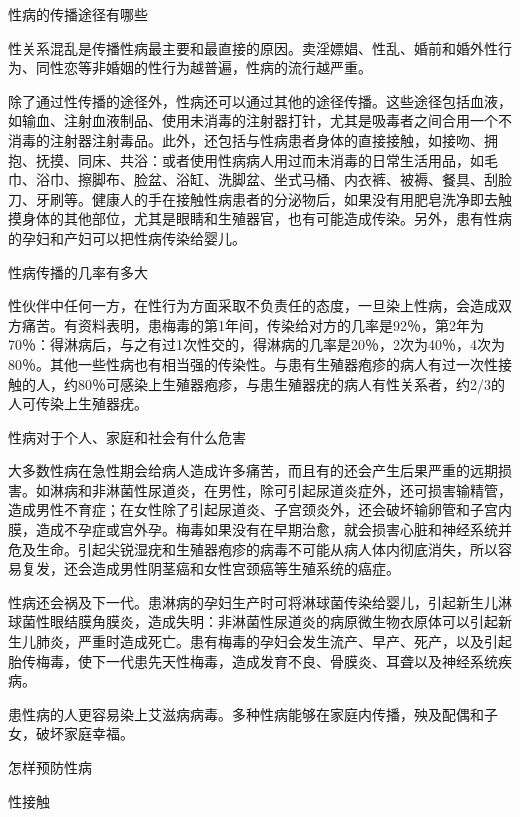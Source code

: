 \documentclass[12pt,UTF8]{ctexbook}
\begin{document}
性病的传播途径有哪些


性关系混乱是传播性病最主要和最直接的原因。卖淫嫖娼、性乱、婚前和婚外性行为、同性恋等非婚姻的性行为越普遍，性病的流行越严重。

除了通过性传播的途径外，性病还可以通过其他的途径传播。这些途径包括血液，如输血、注射血液制品、使用未消毒的注射器打针，尤其是吸毒者之间合用一个不消毒的注射器注射毒品。此外，还包括与性病患者身体的直接接触，如接吻、拥抱、抚摸、同床、共浴：或者使用性病病人用过而未消毒的日常生活用品，如毛巾、浴巾、擦脚布、脸盆、浴缸、洗脚盆、坐式马桶、内衣裤、被褥、餐具、刮脸刀、牙刷等。健康人的手在接触性病患者的分泌物后，如果没有用肥皂洗净即去触摸身体的其他部位，尤其是眼睛和生殖器官，也有可能造成传染。另外，患有性病的孕妇和产妇可以把性病传染给婴儿。





性病传播的几率有多大


性伙伴中任何一方，在性行为方面采取不负责任的态度，一旦染上性病，会造成双方痛苦。有资料表明，患梅毒的第1年间，传染给对方的几率是92％，第2年为70％：得淋病后，与之有过1次性交的，得淋病的几率是20％，2次为40％，4次为80％。其他一些性病也有相当强的传染性。与患有生殖器疱疹的病人有过一次性接触的人，约80％可感染上生殖器疱疹，与患生殖器疣的病人有性关系者，约2/3的人可传染上生殖器疣。





性病对于个人、家庭和社会有什么危害


大多数性病在急性期会给病人造成许多痛苦，而且有的还会产生后果严重的远期损害。如淋病和非淋菌性尿道炎，在男性，除可引起尿道炎症外，还可损害输精管，造成男性不育症；在女性除了引起尿道炎、子宫颈炎外，还会破坏输卵管和子宫内膜，造成不孕症或宫外孕。梅毒如果没有在早期治愈，就会损害心脏和神经系统并危及生命。引起尖锐湿疣和生殖器疱疹的病毒不可能从病人体内彻底消失，所以容易复发，还会造成男性阴茎癌和女性宫颈癌等生殖系统的癌症。

性病还会祸及下一代。患淋病的孕妇生产时可将淋球菌传染给婴儿，引起新生儿淋球菌性眼结膜角膜炎，造成失明：非淋菌性尿道炎的病原微生物衣原体可以引起新生儿肺炎，严重时造成死亡。患有梅毒的孕妇会发生流产、早产、死产，以及引起胎传梅毒，使下一代患先天性梅毒，造成发育不良、骨膜炎、耳聋以及神经系统疾病。

患性病的人更容易染上艾滋病病毒。多种性病能够在家庭内传播，殃及配偶和子女，破坏家庭幸福。





怎样预防性病


性接触
\end{document}
